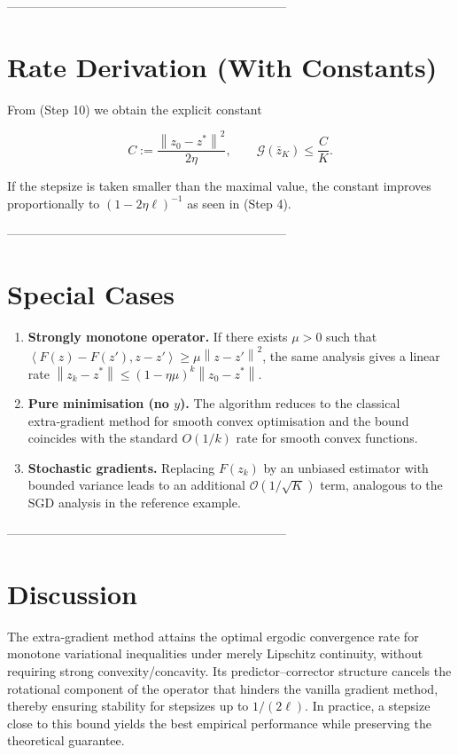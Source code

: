 \documentclass{article}
\newcommand{\norm}[1]{\left\lVert #1\right\rVert}
\newcommand{\inner}[2]{\left\langle #1,#2\right\rangle}
\newcommand{\gap}{\mathcal{G}}
\begin{document}
--------------------------------------------------------------------
\section*{Rate Derivation (With Constants)}
From (Step 10) we obtain the explicit constant

\[
C:=\frac{\norm{z_{0}-z^{*}}^{2}}{2\eta},
\qquad
\gap(\bar z_{K})\le \frac{C}{K}.
\]

If the stepsize is taken smaller than the maximal value,
the constant improves proportionally to \((1-2\eta\ell)^{-1}\) as seen in
(Step 4).

--------------------------------------------------------------------
\section*{Special Cases}
\begin{enumerate}
\item \textbf{Strongly monotone operator.} If there exists \(\mu>0\) such that
\(\inner{F(z)-F(z')}{z-z'}\ge\mu\norm{z-z'}^{2}\), the same analysis gives a
linear rate \(\norm{z_{k}-z^{*}}\le (1-\eta\mu)^{k}\norm{z_{0}-z^{*}}\).

\item \textbf{Pure minimisation (no \(y\)).} The algorithm reduces to the
classical extra‑gradient method for smooth convex optimisation and the bound
coincides with the standard \(O(1/k)\) rate for smooth convex functions.

\item \textbf{Stochastic gradients.} Replacing \(F(z_{k})\) by an unbiased
estimator with bounded variance leads to an additional \(\mathcal{O}(1/\sqrt{K})\)
term, analogous to the SGD analysis in the reference example.
\end{enumerate}

--------------------------------------------------------------------
\section*{Discussion}
The extra‑gradient method attains the optimal ergodic convergence rate for
monotone variational inequalities under merely Lipschitz continuity, without
requiring strong convexity/concavity.  Its predictor–corrector structure
cancels the rotational component of the operator that hinders the vanilla
gradient method, thereby ensuring stability for stepsizes up to
\(1/(2\ell)\).  In practice, a stepsize close to this bound yields the best
empirical performance while preserving the theoretical guarantee.
\end{document}
